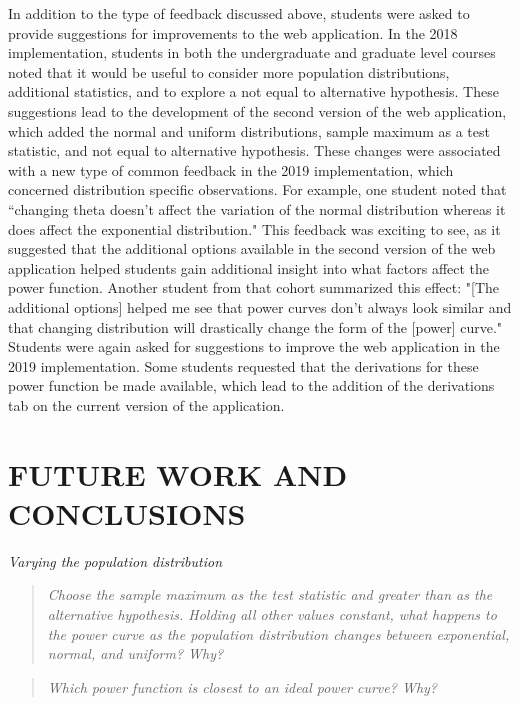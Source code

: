 \documentclass{TISE}
\begin{document}
In addition to the type of feedback discussed above, students were asked to provide suggestions for improvements to the web application. In the 2018 implementation, students in both the undergraduate and graduate level courses noted that it would be useful to consider more population distributions, additional statistics, and to explore a not equal to alternative hypothesis. These suggestions lead to the development of the second version of the web application, which added the normal and uniform distributions, sample maximum as a test statistic, and not equal to alternative hypothesis. These changes were associated with a new type of common feedback in the 2019 implementation, which concerned distribution specific observations. For example, one student noted that ``changing theta doesn't affect the variation of the normal distribution whereas it does affect the exponential distribution." This feedback was exciting to see, as it suggested that the additional options available in the second version of the web application helped students gain additional insight into what factors affect the power function. Another student from that cohort summarized this effect: "[The additional options] helped me see that power curves don't always look similar and that changing distribution will drastically change the form of the [power] curve." Students were again asked for suggestions to improve the web application in the 2019 implementation. Some students requested that the derivations for these power function be made available, which lead to the addition of the derivations tab on the current version of the application. 

\section{FUTURE WORK AND CONCLUSIONS}



\newpage


\newpage

\textit{Varying the population distribution}

\begin{quote}
	\textit{Choose the sample maximum as the test statistic and greater than as the alternative hypothesis. Holding all other values constant, what happens to the power curve as the population distribution changes between exponential, normal, and uniform? Why?}
\end{quote}

\begin{quote}
	\textit{Which power function is closest to an ideal power curve? Why?}
\end{quote}
\end{document}

